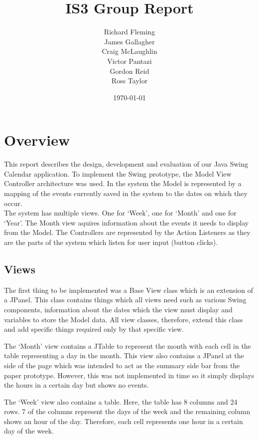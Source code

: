 \documentclass{article}
\title{IS3 Group Report}
\author{
  Richard Fleming \\
  James Gallagher \\
  Craig McLaughlin \\
  Victor Pantazi \\  
  Gordon Reid \\
  Ross Taylor}
\date{\today}
\begin{document}

\maketitle


\section{Overview}

This report describes the design, development and evaluation of our 
Java Swing Calendar application. To implement the Swing prototype, the
Model View Controller architecture was used. In the system the Model
is represented by a mapping of the events currently saved in the
system to the dates on which they occur.\\The system has multiple views.
One for `Week', one for `Month' and one for `Year'. The Month view 
aquires information about the events it needs to display from the
Model. The Controllers are represented by the Action Listeners
as they are the parts of the system which listen for user input (button
clicks).

\subsection{Views}

The first thing to be implemented was a Base View class which is an
extension of a JPanel. This class contains things which all views need
such as various Swing components, information about the dates which
the view must display and variables to store the Model data. All view
classes, therefore, extend this class and add specific things required
only by that specific view.

The `Month' view contains a JTable to represent the month with each cell
in the table representing a day in the month. This view also contains a
JPanel at the side of the page which was intended to act as the summary
side bar from the paper prototype. However, this was not implemented in
time so it simply displays the hours in a certain day but shows no
events.

The `Week' view also contains a table. Here, the table has 8 columns and
24 rows. 7 of the columns represent the days of the week and the
remaining column shows an hour of the day. Therefore, each cell
represents one hour in a certain day of the week.
\end{document}
